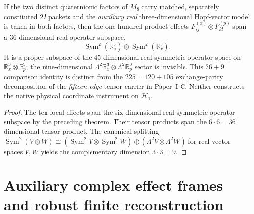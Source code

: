 \documentclass[12pt,a4paper]{article}
\begin{document}
\begin{proposition}
\label{p2c:prop:v318-real-reciprocal-blind-nine}
If the two distinct quaternionic factors of $M_8$ carry matched,
separately constituted $2I$ packets and the \emph{auxiliary real}
three-dimensional Hopf-vector model is taken in both factors,
then the one-hundred product effects $F_{ij}^{(x)}\otimes
F_{kl}^{(p)}$ span a $36$-dimensional real operator subspace,
\[
 \operatorname{Sym}^2(\mathbb R^3_x)\otimes
 \operatorname{Sym}^2(\mathbb R^3_p).
\]
It is a proper subspace of the $45$-dimensional real symmetric
operator space on $\mathbb R^3_x\otimes\mathbb R^3_p$; the
nine-dimensional $\Lambda^2\mathbb R^3_x\otimes
\Lambda^2\mathbb R^3_p$ sector is invisible.
This $36+9$ comparison identity is distinct from the $225=120+105$
exchange-parity decomposition of the \emph{fifteen-edge} tensor
carrier in Paper~I-C.  Neither constructs the native physical
coordinate instrument on $\mathcal H_1$.
\end{proposition}
\begin{proof}
The ten local effects span the six-dimensional real symmetric
operator subspace by the preceding theorem.  Their tensor products
span the $6\cdot6=36$ dimensional tensor product.  The canonical
splitting
$\operatorname{Sym}^2(V\otimes W)
\cong(\operatorname{Sym}^2V\otimes\operatorname{Sym}^2W)
\oplus(\Lambda^2V\otimes\Lambda^2W)$
for real vector spaces $V,W$ yields the complementary dimension
$3\cdot3=9$.
\end{proof}


\section{Auxiliary complex effect frames and robust finite reconstruction}
\end{document}
